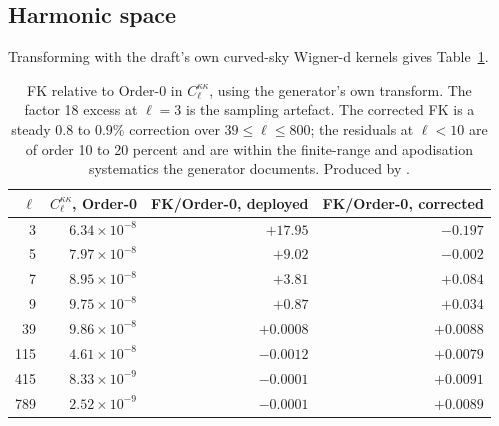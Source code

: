 \subsection{Harmonic space}

Transforming with the draft's own curved-sky Wigner-d kernels gives
Table~\ref{tab:cl}.

\begin{table}[h]
\centering
\begin{tabular}{rrrr}
\toprule
$\ell$ & $C_\ell^{\kappa\kappa}$, Order-0 & FK/Order-0, deployed & FK/Order-0, corrected \\
\midrule
   3 & $6.34\times10^{-8}$ & $+17.95$   & $-0.197$ \\
   5 & $7.97\times10^{-8}$ & $+9.02$    & $-0.002$ \\
   7 & $8.95\times10^{-8}$ & $+3.81$    & $+0.084$ \\
   9 & $9.75\times10^{-8}$ & $+0.87$    & $+0.034$ \\
  39 & $9.86\times10^{-8}$ & $+0.0008$  & $+0.0088$ \\
 115 & $4.61\times10^{-8}$ & $-0.0012$  & $+0.0079$ \\
 415 & $8.33\times10^{-9}$ & $-0.0001$  & $+0.0091$ \\
 789 & $2.52\times10^{-9}$ & $-0.0001$  & $+0.0089$ \\
\bottomrule
\end{tabular}
\caption{FK relative to Order-0 in $C_\ell^{\kappa\kappa}$, using the
generator's own transform. The factor 18 excess at $\ell=3$ is the
sampling artefact. The corrected FK is a steady $0.8$ to $0.9\%$ correction
over $39\le\ell\le800$; the residuals at $\ell<10$ are of order 10 to 20
percent and are within the finite-range and apodisation systematics the
generator documents. Produced by .}
\label{tab:cl}
\end{table}
